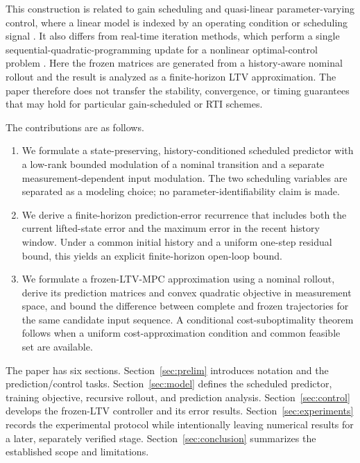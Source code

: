 ﻿\documentclass[journal]{IEEEtran}
\begin{document}
This construction is related to gain scheduling and quasi-linear parameter-varying control, where a linear model is indexed by an operating condition or scheduling signal \cite{rugh2000gain,leith1998velocity,cisneros2016qlmpc,cisneros2020qlpv}. It also differs from real-time iteration methods, which perform a single sequential-quadratic-programming update for a nonlinear optimal-control problem \cite{diehl2005realtime,gros2020rti}. Here the frozen matrices are generated from a history-aware nominal rollout and the result is analyzed as a finite-horizon LTV approximation. The paper therefore does not transfer the stability, convergence, or timing guarantees that may hold for particular gain-scheduled or RTI schemes.

The contributions are as follows.
\begin{enumerate}
    \item We formulate a state-preserving, history-conditioned scheduled predictor with a low-rank bounded modulation of a nominal transition and a separate measurement-dependent input modulation. The two scheduling variables are separated as a modeling choice; no parameter-identifiability claim is made.
    \item We derive a finite-horizon prediction-error recurrence that includes both the current lifted-state error and the maximum error in the recent history window. Under a common initial history and a uniform one-step residual bound, this yields an explicit finite-horizon open-loop bound.
    \item We formulate a frozen-LTV-MPC approximation using a nominal rollout, derive its prediction matrices and convex quadratic objective in measurement space, and bound the difference between complete and frozen trajectories for the same candidate input sequence. A conditional cost-suboptimality theorem follows when a uniform cost-approximation condition and common feasible set are available.
\end{enumerate}

The paper has six sections. Section~\ref{sec:prelim} introduces notation and the prediction/control tasks. Section~\ref{sec:model} defines the scheduled predictor, training objective, recursive rollout, and prediction analysis. Section~\ref{sec:control} develops the frozen-LTV controller and its error results. Section~\ref{sec:experiments} records the experimental protocol while intentionally leaving numerical results for a later, separately verified stage. Section~\ref{sec:conclusion} summarizes the established scope and limitations.
\end{document}
